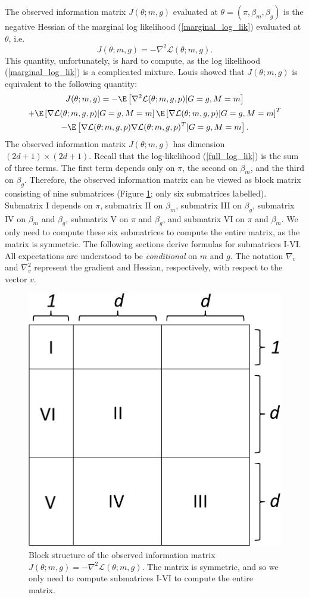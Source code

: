 \documentclass[12pt]{article}
\begin{document}
\begin{appendices}
The observed information matrix $J(\theta; m, g)$ evaluated at $\theta = (\pi, \beta_m, \beta_g)$ is the negative Hessian of the marginal log likelihood (\ref{marginal_log_lik}) evaluated at $\theta$, i.e.
$$J(\theta; m, g) = - \nabla^2\mathcal{L}(\theta; m, g) .$$ This quantity, unfortunately, is hard to compute, as the log likelihood (\ref{marginal_log_lik}) is a complicated mixture. Louis \cite{Louis1982} showed that $J(\theta; m, g)$ is equivalent to the following quantity:
\begin{multline}\label{zero_inf_info_mat}
J(\theta; m, g) = -\E \left[\nabla^2 \mathcal{L}(\theta; m, g, p) | G = g, M = m \right] \\ + \E\left[\nabla \mathcal{L}(\theta; m, g, p) | G = g, M = m \right] \E\left[\nabla \mathcal{L}(\theta; m, g, p) | G = g, M = m \right]^T \\ - \E\left[ \nabla\mathcal{L}(\theta; m, g, p) \nabla \mathcal{L}(\theta; m, g, p)^T | G = g, M = m \right].
\end{multline}
The observed information matrix $J(\theta; m, g)$ has dimension $(2d+1) \times (2d + 1).$ Recall that the log-likelihood (\ref{full_log_lik}) is the sum of three terms. The first term depends only on $\pi$, the second on $\beta_m$, and the third on $\beta_g$. Therefore, the observed information matrix can be viewed as block matrix consisting of nine submatrices (Figure \ref{infomatrixbackground}; only six submatrices labelled). Submatrix I depends on $\pi$, submatrix II on $\beta_m$, submatrix III on $\beta_g$, submatrix IV on $\beta_m$ and $\beta_g$, submatrix V on $\pi$ and $\beta_g$, and submatrix VI on $\pi$ and $\beta_m$. We only need to compute these six submatrices to compute the entire matrix, as the matrix is symmetric. The following sections derive formulas for submatrices I-VI. All expectations are understood to be \textit{conditional} on $m$ and $g$. The notation $\nabla_v$  and $\nabla^2_v$  represent the gradient and Hessian, respectively, with respect to the vector $v$.

\begin{figure}
	\centering
	\includegraphics[width=0.45\linewidth]{../../figures/info_matrix/info_matrix_background}
	\caption{Block structure of the observed information matrix $J(\theta; m, g) = -\nabla^2 \mathcal{L}(\theta; m, g)$. The matrix is symmetric, and so we only need to compute submatrices I-VI to compute the entire matrix.}
	\label{infomatrixbackground}
\end{figure}


\end{appendices}
\end{document}
